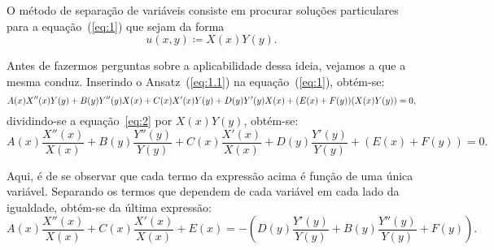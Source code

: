 \documentclass[10pt,a4paper]{article}
\begin{document}
	O método de separação de variáveis consiste em procurar soluções particulares para a equação~(\ref{eq:1}) que sejam da forma
	\begin{equation}
		u(x,y)\coloneqq X(x)Y(y).
		\label{eq:1.1}
	\end{equation}
	
	Antes de fazermos perguntas sobre a aplicabilidade dessa ideia, vejamos a que a mesma conduz. Inserindo o Ansatz~(\ref{eq:1.1}) na equação~(\ref{eq:1}), obtém-se:
	\begin{equation}
		\small
		A(x)X''(x)Y(y) + B(y)Y''(y)X(x) + C(x)X'(x)Y(y) + D(y)Y'(y)X(x) + (E(x)+F(y))(X(x)Y(y)) = 0,
		\label{eq:2}
	\end{equation}
	dividindo-se a equação~\ref{eq:2} por $X(x)Y(y)$, obtém-se:
		\begin{equation}
		A(x)\frac{X''(x)}{X(x)} + B(y)\frac{Y''(y)}{Y(y)} + C(x)\frac{X'(x)}{X(x)} + D(y)\frac{Y'(y)}{Y(y)} + (E(x)+F(y)) = 0.
		\label{eq:3}
	\end{equation}
	
	Aqui, é de se observar que cada termo da expressão acima é função de uma única variável. Separando os termos que dependem de cada variável em cada lado da igualdade, obtém-se da última expressão:
	\begin{equation}
		A(x)\frac{X''(x)}{X(x)} + C(x)\frac{X'(x)}{X(x)} + E(x) = -\left(D(y)\frac{Y'(y)}{Y(y)} + B(y)\frac{Y''(y)}{Y(y)} + F(y)\right).
		\label{eq:4}
	\end{equation}
	
\end{document}
